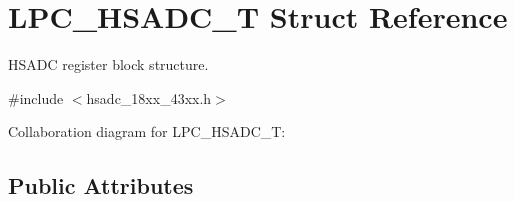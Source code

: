 \hypertarget{struct_l_p_c___h_s_a_d_c___t}{}\section{L\+P\+C\+\_\+\+H\+S\+A\+D\+C\+\_\+T Struct Reference}
\label{struct_l_p_c___h_s_a_d_c___t}


H\+S\+A\+DC register block structure.  




{\ttfamily \#include $<$hsadc\+\_\+18xx\+\_\+43xx.\+h$>$}



Collaboration diagram for L\+P\+C\+\_\+\+H\+S\+A\+D\+C\+\_\+T\+:
\subsection*{Public Attributes}
